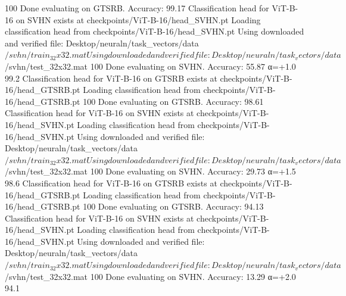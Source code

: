 100%
Done evaluating on GTSRB. Accuracy: 99.17%
Classification head for ViT-B-16 on SVHN exists at checkpoints/ViT-B-16/head_SVHN.pt
Loading classification head from checkpoints/ViT-B-16/head_SVHN.pt
Using downloaded and verified file: Desktop/neuraln/task_vectors/data$/svhn/train_32x32.mat
Using downloaded and verified file: Desktop/neuraln/task_vectors/data$/svhn/test_32x32.mat
100%
Done evaluating on SVHN. Accuracy: 55.87%
  α=+1.0        99.2%
Classification head for ViT-B-16 on GTSRB exists at checkpoints/ViT-B-16/head_GTSRB.pt
Loading classification head from checkpoints/ViT-B-16/head_GTSRB.pt
100%
Done evaluating on GTSRB. Accuracy: 98.61%
Classification head for ViT-B-16 on SVHN exists at checkpoints/ViT-B-16/head_SVHN.pt
Loading classification head from checkpoints/ViT-B-16/head_SVHN.pt
Using downloaded and verified file: Desktop/neuraln/task_vectors/data$/svhn/train_32x32.mat
Using downloaded and verified file: Desktop/neuraln/task_vectors/data$/svhn/test_32x32.mat
100%
Done evaluating on SVHN. Accuracy: 29.73%
  α=+1.5        98.6%
Classification head for ViT-B-16 on GTSRB exists at checkpoints/ViT-B-16/head_GTSRB.pt
Loading classification head from checkpoints/ViT-B-16/head_GTSRB.pt
100%
Done evaluating on GTSRB. Accuracy: 94.13%
Classification head for ViT-B-16 on SVHN exists at checkpoints/ViT-B-16/head_SVHN.pt
Loading classification head from checkpoints/ViT-B-16/head_SVHN.pt
Using downloaded and verified file: Desktop/neuraln/task_vectors/data$/svhn/train_32x32.mat
Using downloaded and verified file: Desktop/neuraln/task_vectors/data$/svhn/test_32x32.mat
100%
Done evaluating on SVHN. Accuracy: 13.29%
  α=+2.0        94.1%

